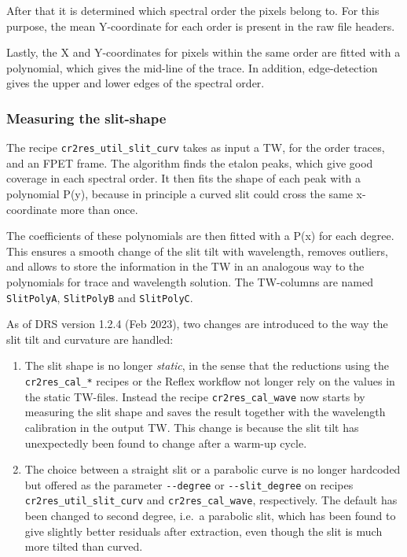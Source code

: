 After that it is determined which spectral order the pixels belong to. For this
purpose, the mean Y-coordinate for each order is present in the raw file
headers.

Lastly, the X and Y-coordinates for pixels within the same order are fitted with
a polynomial, which gives the mid-line of the trace. In addition, edge-detection
gives the upper and lower edges of the spectral order.

\subsubsection{Measuring the slit-shape}
\label{sec:tilt}

The recipe \verb!cr2res_util_slit_curv! takes as input a TW, for the order
traces, and an FPET frame. The algorithm finds the etalon peaks, which give good
coverage in each spectral order. It then fits the shape of each peak with a
polynomial P(y), because in principle a curved slit could cross the same
x-coordinate more than once.

The coefficients of these polynomials are then fitted with a P(x) for each
degree. This ensures a smooth change of the slit tilt with wavelength, removes
outliers, and allows to store the information in the TW in an analogous way to
the polynomials for trace and wavelength solution. The TW-columns are named
\verb!SlitPolyA!, \verb!SlitPolyB! and \verb!SlitPolyC!.

As of DRS version 1.2.4 (Feb 2023), two changes are introduced to the way the
slit tilt and curvature are handled:

\begin{enumerate}
    \item The slit shape is no longer \emph{static}, in the sense that the
    reductions using the \verb!cr2res_cal_*! recipes or the Reflex workflow not
    longer rely on the values in the static TW-files. Instead the recipe
    \verb!cr2res_cal_wave! now starts by measuring the slit shape and saves the
    result together with the wavelength calibration in the output TW. This
    change is because the slit tilt has unexpectedly been found to change after
    a warm-up cycle.
    \item The choice between a straight slit or a parabolic curve is no longer
    hardcoded but offered as the parameter \verb!--degree! or
    \verb!--slit_degree! on recipes \verb!cr2res_util_slit_curv! and
    \verb!cr2res_cal_wave!, respectively. The default has been changed to second
    degree, i.e.~a parabolic slit, which has been found to give slightly better
    residuals after extraction, even though the slit is much more tilted than
    curved.
\end{enumerate}

